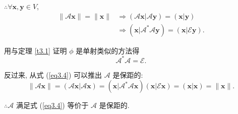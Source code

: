 \documentclass{ctexart}
\begin{document}
$\therefore\forall\boldsymbol{x},\boldsymbol{y}\in V$,
\begin{align*}
    \|\mathcal{A}\boldsymbol{x}\|=\|\boldsymbol{x}\| & \Rightarrow(\mathcal{A}\boldsymbol{x}|\mathcal{A}\boldsymbol{y})=(\boldsymbol{x}|\boldsymbol{y}) \\
    & \Rightarrow(\boldsymbol{x}|\mathcal{A}^*\mathcal{A}\boldsymbol{y})=(\boldsymbol{x}|\mathcal{E}\boldsymbol{y}).
\end{align*}

用与定理 \ref{t3.1} 证明 $\phi$ 是单射类似的方法得
\begin{equation}\label{eq3.4}
    \mathcal{A}^*\mathcal{A}=\mathcal{E}.
\end{equation}

反过来, 从式 (\ref{eq3.4}) 可以推出 $\mathcal{A}$ 是保距的:
\[\|\mathcal{A}\boldsymbol{x}\|=(\mathcal{A}\boldsymbol{x}|\mathcal{A}\boldsymbol{x})=(\boldsymbol{x}|\mathcal{A}^*\mathcal{A}\boldsymbol{x})(\boldsymbol{x}|\mathcal{E}\boldsymbol{x})=(\boldsymbol{x}|\boldsymbol{x})=\|\boldsymbol{x}\|.\]

$\therefore\mathcal{A}$ 满足式 (\ref{eq3.4}) 等价于 $\mathcal{A}$ 是保距的.
\end{document}
